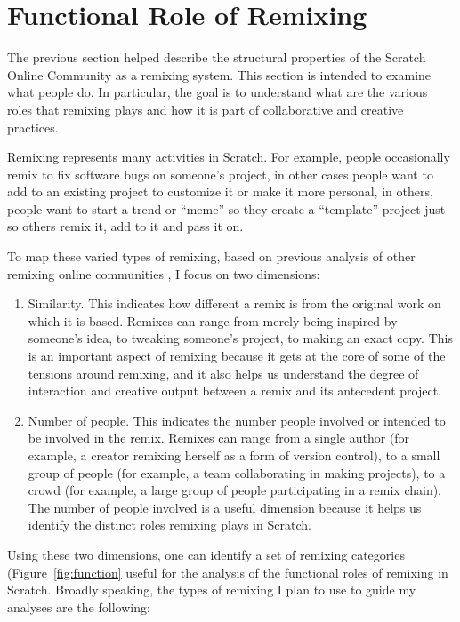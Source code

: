 \section{Functional Role of Remixing}

The previous section helped describe the structural properties of the Scratch Online Community as a remixing system.
This section is intended to examine what people do.
In particular, the goal is to understand what are the various roles that remixing plays and how it is part of collaborative and creative practices.

Remixing represents many activities in Scratch.
For example, people occasionally remix to fix software bugs on someone's project, in other cases people want to add to an existing project to customize it or make it more personal, in others, people want to start a trend or ``meme'' so they create a ``template'' project just so others remix it, add to it and pass it on.

To map these varied types of remixing, based on previous analysis of other remixing online communities \citep{seneviratne_remix_2010}, I focus on two dimensions:
\begin{enumerate}
\item{Similarity}. This indicates how different a remix is from the original work on which it is based. 
Remixes can range from merely being inspired by someone's idea, to tweaking someone's project, to making an exact copy.
This is an important aspect of remixing because it gets at the core of some of the tensions around remixing, and it also helps us understand the degree of interaction and creative output between a remix and its antecedent project.
\item{Number of people}. This indicates the number people involved or intended to be involved in the remix.
Remixes can range from a single author (for example, a creator remixing herself as a form of version control), to a small group of people (for example, a team collaborating in making projects), to a crowd (for example, a large group of people participating in a remix chain).
The number of people involved is a useful dimension because it helps us identify the distinct roles remixing plays in Scratch.
\end{enumerate}

Using these two dimensions, one can identify a set of remixing categories (Figure~\ref{fig:function} useful for the analysis of the functional roles of remixing in Scratch.
Broadly speaking, the types of remixing I plan to use to guide my analyses are the following:

